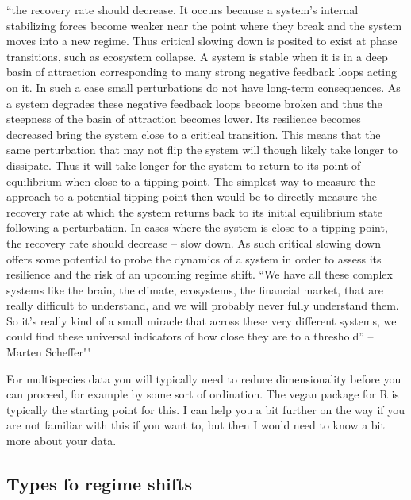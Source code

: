 \documentclass[12pt,twoside]{reedthesis}
\begin{document}
``the recovery rate should decrease. It occurs because a system's internal stabilizing forces become weaker near the point where they break and the system moves into a new regime. Thus critical slowing down is posited to exist at phase transitions, such as ecosystem collapse. A system is stable when it is in a deep basin of attraction corresponding to many strong negative feedback loops acting on it. In such a case small perturbations do not have long-term consequences. As a system degrades these negative feedback loops become broken and thus the steepness of the basin of attraction becomes lower.
Its resilience becomes decreased bring the system close to a critical transition. This means that the same perturbation that may not flip the system will though likely take longer to dissipate. Thus it will take longer for the system to return to its point of equilibrium when close to a tipping point. The simplest way to measure the approach to a potential tipping point then would be to directly measure the recovery rate at which the system returns back to its initial equilibrium state following a perturbation. In cases where the system is close to a tipping point, the recovery rate should decrease -- slow down. As such critical slowing down offers some potential to probe the dynamics of a system in order to assess its resilience and the risk of an upcoming regime shift. ``We have all these complex systems like the brain, the climate, ecosystems, the financial market, that are really difficult to understand, and we will probably never fully understand them. So it's really kind of a small miracle that across these very different systems, we could find these universal indicators of how close they are to a threshold'' -- Marten Scheffer""

For multispecies data you will typically need to reduce dimensionality before you can proceed, for example by some sort of ordination. The vegan package for R is typically the starting point for this. I can help you a bit further on the way if you are not familiar with this if you want to, but then I would need to know a bit more about your data.

\hypertarget{types-fo-regime-shifts}{%
\subsection{Types fo regime shifts}\label{types-fo-regime-shifts}}
\end{document}
